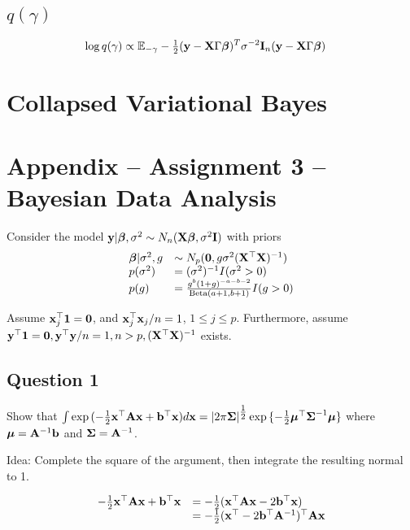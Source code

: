 \documentclass{amsart}[12pt]
\begin{document}
\subsection{$q(\gamma)$}
\begin{align*}
	\log q(\gamma) & \propto \mathbb{E}_{-\gamma} -\tfrac{1}{2} ({\bf y} - {\bf X} \Gamma {\boldsymbol\beta})^T \sigma^{-2} {\bf I}_n ({\bf y} - {\bf X} \Gamma {\boldsymbol\beta}) 
\end{align*}

\section{Collapsed Variational Bayes}

\section{Appendix -- Assignment 3 -- Bayesian Data Analysis}

Consider the model ${\bf y} | {\boldsymbol \beta}, \sigma^2 \sim N_n({\bf X} {\boldsymbol \beta}, \sigma^2 {\bf I})$ with priors
\begin{equation*}
	\begin{array}{ll}
		{\boldsymbol\beta} | \sigma^2, g & \sim N_p({\bf 0}, g \sigma^2({\bf X}^\top {\bf X})^{-1})                       \\
		p(\sigma^2)          & = (\sigma^2)^{-1} I(\sigma^2 > 0)                                     \\
		p(g)                 & = \frac{g^b (1 + g)^{-a - b - 2}}{\text{Beta}(a + 1, b + 1)} I(g > 0) 
	\end{array}
\end{equation*}

Assume ${\bf x}_j^\top{\bf1} = {\bf 0}$, and ${\bf x}_j^\top {\bf x}_j / n = 1$, $1 \leq j \leq p$.
Furthermore, assume ${\bf y}^\top {\bf1} = {\bf 0}, {\bf y}^\top {\bf y} / n  = 1, n > p, ({\bf X}^\top {\bf X})^{-1}$ exists.

\subsection{Question 1}

Show that $\int \exp{(- \tfrac{1}{2} {\bf x}^\top {\bf A}{\bf x}+ {\bf b}^\top {\bf x})} d {\bf x} = |2 \pi {\boldsymbol\Sigma}|^{\tfrac{1}{2}} \exp{\{ - \tfrac{1}{2} {\boldsymbol\mu}^\top {\boldsymbol\Sigma}^{-1} {\boldsymbol\mu}\}}$ where ${\boldsymbol \mu} = {\bf A}^{-1} {\bf b}$ and ${\boldsymbol \Sigma} = {\bf A}^{-1}$.

Idea: Complete the square of the argument, then integrate the resulting normal to 1.

\begin{equation*}
	\begin{array}{ll}
		-\tfrac{1}{2} {\bf x}^\top {\bf A} {\bf x} + {\bf b}^\top {\bf x} & = -\tfrac{1}{2} ({\bf x}^\top {\bf A} {\bf x} - 2 {\bf b}^\top {\bf x})           \\
		                                       & = -\tfrac{1}{2} ({\bf x}^\top - 2 {\bf b}^\top {\bf A}^{-1})^\top {\bf A} {\bf x} 
	\end{array}
\end{equation*}
\end{document}
